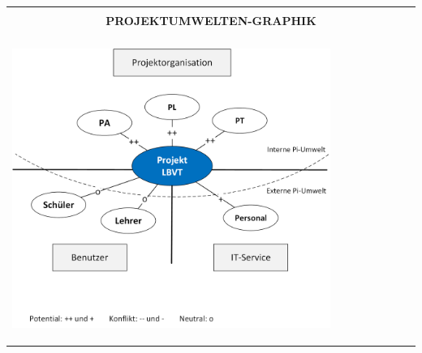 \begingroup
\renewcommand*{\arraystretch}{1.1} %
\begin{tabularx}{\textwidth}{|X|}
    \hline
    \multicolumn{1}{|c|}{\vspace{-0.2cm}\rowcolor{gray}} \\
    \multicolumn{1}{|c|}{\rowcolor{gray} \bfseries \color{white} PROJEKTUMWELTEN-GRAPHIK \vspace{-0.15cm}} \\
    \rowcolor{gray}\\
    \hline
    \vspace{-0.5cm}
    \begin{center}
    \includegraphics[width=0.8\textwidth]{images/Projektumwelt.png}
    \end{center} \\
    \hline
\end{tabularx}
\endgroup



